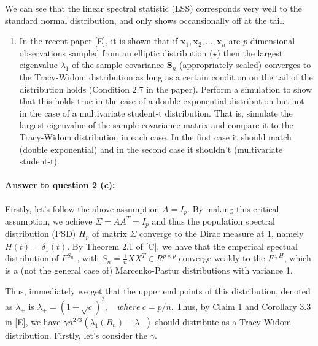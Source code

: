 \documentclass[
]{article}
\providecommand{\tightlist}{%
  \setlength{\itemsep}{0pt}\setlength{\parskip}{0pt}}
\begin{document}
We can see that the linear spectral statistic (LSS) corresponds very
well to the standard normal distribution, and only shows occansionally
off at the tail.

\begin{enumerate}
\def\labelenumi{(\alph{enumi})}
\setcounter{enumi}{2}
\tightlist
\item
  In the recent paper {[}E{]}, it is shown that if
  \(\mathbf{x}_1, \mathbf{x}_2, \ldots, \mathbf{x}_n\) are
  \(p\)-dimensional observations sampled from an elliptic distribution
  (\(\star\)) then the largest eigenvalue \(\lambda_1\) of the sample
  covariance \(\mathbf{S}_n\) (appropriately scaled) converges to the
  Tracy-Widom distribution as long as a certain condition on the tail of
  the distribution holds (Condition 2.7 in the paper). Perform a
  simulation to show that this holds true in the case of a double
  exponential distribution but not in the case of a multivariate
  student-t distribution. That is, simulate the largest eigenvalue of
  the sample covariance matrix and compare it to the Tracy-Widom
  distribution in each case. In the first case it should match (double
  exponential) and in the second case it shouldn't (multivariate
  student-t).
\end{enumerate}

\paragraph{\texorpdfstring{\textbf{Answer to question 2
(c)}:}{Answer to question 2 (c):}}\label{answer-to-question-2-c}

Firstly, let's follow the above assumption \(A = I_p\). By making this
critical assumption, we achieve \(\Sigma = AA^T = I_p\) and thus the
population spectral distribution (PSD) \(H_p\) of matrix \(\Sigma\)
converge to the Dirac measure at 1, namely \(H(t) = \delta_1(t)\). By
Theorem 2.1 of {[}C{]}, we have that the emperical spectual distribution
of \(F^{S_n}\) , with \(S_n = \frac{1}{n}XX^T\in R^{p \times p}\)
converge weakly to the \(F^{c,H}\), which is a (not the general case of)
Marcenko-Pastur distributions with variance 1.

Thus, immediately we get that the upper end points of this distribution,
denoted as \(\lambda_+\) is
\(\lambda_+ = (1 + \sqrt c )^2, \quad where \ c = p/n\). Thus, by Claim
1 and Corollary 3.3 in {[}E{]}, we have
\(\gamma n^{2/3}(\lambda_1(B_n) - \lambda_+)\) should distribute as a
Tracy-Widom distribution. Firstly, let's consider the \(\gamma\).
\end{document}
